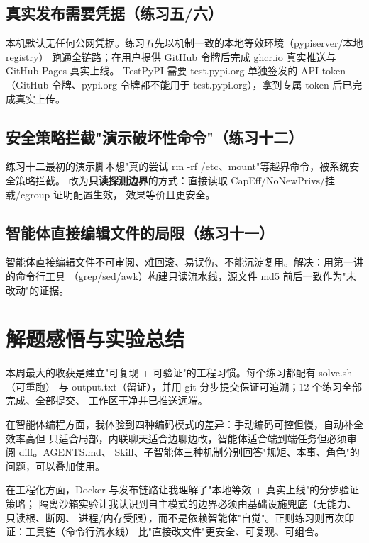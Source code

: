 \documentclass[UTF8]{ctexart}
\begin{document}
\subsection{真实发布需要凭据（练习五/六）}

本机默认无任何公网凭据。练习五先以机制一致的本地等效环境（pypiserver/本地 registry）
跑通全链路；在用户提供 GitHub 令牌后完成 ghcr.io 真实推送与 GitHub Pages 真实上线。
TestPyPI 需要 test.pypi.org 单独签发的 API token（GitHub 令牌、pypi.org 令牌都不能用于 test.pypi.org），拿到专属 token 后已完成真实上传。

\subsection{安全策略拦截"演示破坏性命令"（练习十二）}

练习十二最初的演示脚本想"真的尝试 rm -rf /etc、mount"等越界命令，被系统安全策略拦截。
改为\textbf{只读探测边界}的方式：直接读取 CapEff/NoNewPrivs/挂载/cgroup 证明配置生效，
效果等价且更安全。

\subsection{智能体直接编辑文件的局限（练习十一）}

智能体直接编辑文件不可审阅、难回滚、易误伤、不能沉淀复用。解决：用第一讲的命令行工具
（grep/sed/awk）构建只读流水线，源文件 md5 前后一致作为"未改动"的证据。

\section{解题感悟与实验总结}

本周最大的收获是建立"可复现 + 可验证"的工程习惯。每个练习都配有 solve.sh（可重跑）
与 output.txt（留证），并用 git 分步提交保证可追溯；12 个练习全部完成、全部提交、
工作区干净并已推送远端。

在智能体编程方面，我体验到四种编码模式的差异：手动编码可控但慢，自动补全效率高但
只适合局部，内联聊天适合边聊边改，智能体适合端到端任务但必须审阅 diff。AGENTS.md、
Skill、子智能体三种机制分别回答"规矩、本事、角色"的问题，可以叠加使用。

在工程化方面，Docker 与发布链路让我理解了"本地等效 + 真实上线"的分步验证策略；
隔离沙箱实验让我认识到自主模式的边界必须由基础设施兜底（无能力、只读根、断网、
进程/内存受限），而不是依赖智能体"自觉"。正则练习则再次印证：工具链（命令行流水线）
比"直接改文件"更安全、可复现、可组合。
\end{document}
